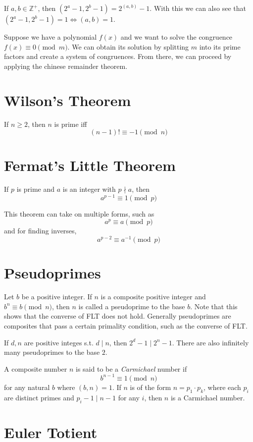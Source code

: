 \documentclass{article}
\begin{document}
\begin{multicols*}{2}
If $a,b \in \mathbb{Z}^+$, then $(2^a - 1, 2^b - 1) = 2^{(a,b)} - 1$. With this we can also see that $(2^a - 1, 2^b - 1) = 1 \Leftrightarrow (a, b) = 1$.

Suppose we have a polynomial $f(x)$ and we want to solve the congruence $f(x) \equiv 0 \pmod{m}$. We can obtain its solution by splitting $m$ into its prime factors and create a system of congruences. From there, we can proceed by applying the chinese remainder theorem.

\section{Wilson's Theorem}

If $n \geq 2$, then $n$ is prime iff \[(n - 1)! \equiv -1 \pmod{n}\]

\section{Fermat's Little Theorem}

If $p$ is prime and $a$ is an integer with $p \nmid a$, then \[a^{p-1} \equiv 1 \pmod{p}\]

This theorem can take on multiple forms, such as \[a^{p} \equiv a \pmod{p}\] and for finding inverses, \[a^{p -2} \equiv a^{-1} \pmod{p}\]

\section{Pseudoprimes}

Let $b$ be a positive integer. If $n$ is a composite positive integer and $b^n \equiv b \pmod{n}$, then $n$ is called a pseudoprime to the base $b$. Note that this shows that the converse of FLT does not hold. Generally pseudoprimes are composites that pass a certain primality condition, such as the converse of FLT.

If $d, n$ are positive integes s.t. $d \mid n$, then $2^d - 1 \mid 2^n - 1$. There are also infinitely many pseudoprimes to the base $2$.

A composite number $n$ is said to be a \textit{Carmichael} number if \[b^{n-1} \equiv 1 \pmod{n}\] for any natural $b$ where $(b,n) = 1$. If $n$ is of the form $n = p_1\cdot p_k$, where each $p_i$ are distinct primes and $p_i - 1 \mid n - 1$ for any $i$, then $n$ is a Carmichael number.

\section{Euler Totient}


\end{multicols*}
\end{document}
